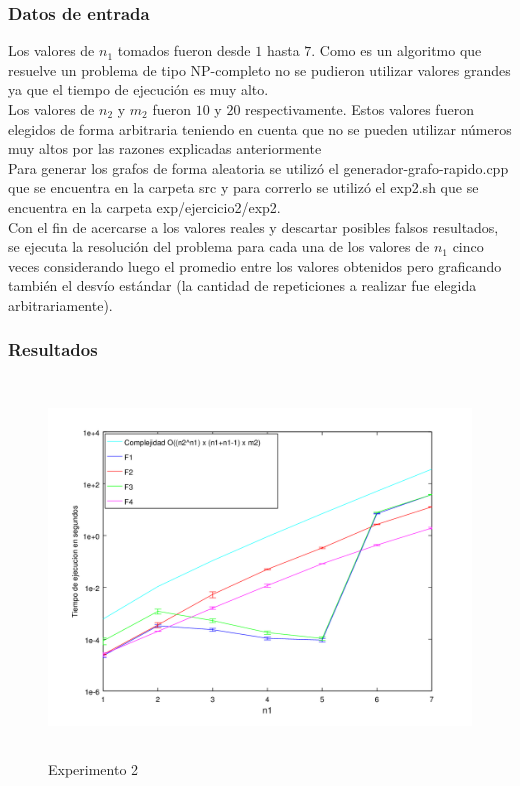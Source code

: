 \subsubsection*{Datos de entrada}\;
\noindent Los valores de $n_1$ tomados fueron desde $1$ hasta $7$. Como es un algoritmo que resuelve un problema de tipo NP-completo no se pudieron utilizar valores grandes ya que el tiempo de ejecución es muy alto.\\
       Los valores de $n_2$ y $m_2$ fueron $10$ y $20$ respectivamente. Estos valores fueron elegidos de forma arbitraria teniendo en cuenta que no se pueden utilizar números muy altos por las razones explicadas anteriormente\\
        Para generar los grafos de forma aleatoria se utilizó el generador-grafo-rapido.cpp que se encuentra en la carpeta src y para correrlo se utilizó el exp2.sh que se encuentra en la carpeta exp/ejercicio2/exp2. \\
        Con el fin de acercarse a los valores reales y descartar posibles falsos resultados, se ejecuta la resolución del problema para cada una de los valores de $n_1$ cinco veces considerando luego el promedio entre los valores obtenidos pero graficando también el desvío estándar (la cantidad de repeticiones a realizar fue elegida arbitrariamente).\; 

\subsubsection*{Resultados}\;

    \begin{figure}[H]
      \includegraphics[height=10cm]{graficos/ejercicio2-exp2.png}
       \caption{Experimento 2}
	\end{figure}


